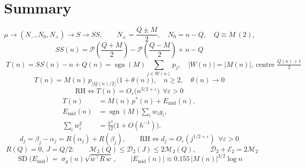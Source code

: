 \documentclass[11pt]{amsart}
\numberwithin{equation}{section}
\theoremstyle{plain}
\theoremstyle{definition}
\theoremstyle{remark}
\newcommand{\mob}{\mu}
\newcommand{\Mert}{M}
\newcommand{\Sq}{Q}
\newcommand{\PS}{\mathcal P}
\begin{document}
\section{Summary}
\label{sec:summary}

\begin{equation}
\label{eq:summary-map}
\mob \longrightarrow (N_-,N_0,N_+) \longrightarrow S \longrightarrow SS,
\qquad
N_\pm=\frac{\Sq\pm\Mert}2,\quad N_0=n-\Sq,\quad \Sq\equiv\Mert\ (2),
\end{equation}
\begin{equation}
\label{eq:summary-closed}
\boxed{\;
SS(n)=\PS\!\left(\frac{\Sq+\Mert}2\right)-\PS\!\left(\frac{\Sq-\Mert}2\right)+n-\Sq \;}
\end{equation}
\begin{equation}
\label{eq:summary-block}
\boxed{\;T(n)=SS(n)-n+\Sq(n)=\operatorname{sgn}(\Mert)\!\!\sum_{j\in W(n)}\!\!p_j,
\quad |W(n)|=|\Mert(n)|,\ \text{centre } \tfrac{\Sq(n)+1}2 \;}
\end{equation}
\begin{equation}
\label{eq:summary-scale}
\boxed{\;T(n)=\Mert(n)\,p_{\lfloor \Sq(n)/2\rfloor}\bigl(1+\theta(n)\bigr),\quad n\ge2,\quad \theta(n)\to0\;}
\end{equation}
\begin{equation}
\label{eq:summary-rh}
\boxed{\;\mathrm{RH}\iff T(n)=O_\varepsilon\bigl(n^{3/2+\varepsilon}\bigr)\ \ \forall\varepsilon>0\;}
\end{equation}
\begin{equation}
\label{eq:summary-residual}
\boxed{\begin{aligned}
T(n)&=\Mert(n)\,p^{*}(n)+E_{\mathrm{mid}}(n),\\
E_{\mathrm{mid}}(n)&=\operatorname{sgn}(\Mert)\sum_i w_i g_i,\\
\sum_i w_i^2&=\frac{h^3}{12}\bigl(1+O(h^{-1})\bigr).
\end{aligned}}
\end{equation}
\begin{equation}
\label{eq:summary-pairing}
\boxed{\;d_j=\beta_j-\alpha_j=R(\alpha_j)+R(\beta_j),
\qquad
\mathrm{RH}\iff d_j=O_\varepsilon(j^{1/2+\varepsilon})\ \ \forall\varepsilon>0\;}
\end{equation}
\begin{equation}
\label{eq:summary-quadratic}
\boxed{\;R(Q)=0,\ J=Q/2:\qquad
\mathcal M_2(Q)\le\mathcal D_2(J)\le2\mathcal M_2(Q),
\qquad
\mathcal D_2+\mathcal E_2=2\mathcal M_2\;}
\end{equation}
\begin{equation}
\label{eq:summary-sd}
\boxed{\;\operatorname{SD}\bigl(E_{\mathrm{mid}}\bigr)\;=\;\sigma_g(n)\sqrt{w^{\!\top}\!R\,w}\,,
\qquad
|E_{\mathrm{mid}}(n)|\approx0.155\,|\Mert(n)|^{3/2}\log n\;}
\end{equation}
\end{document}
